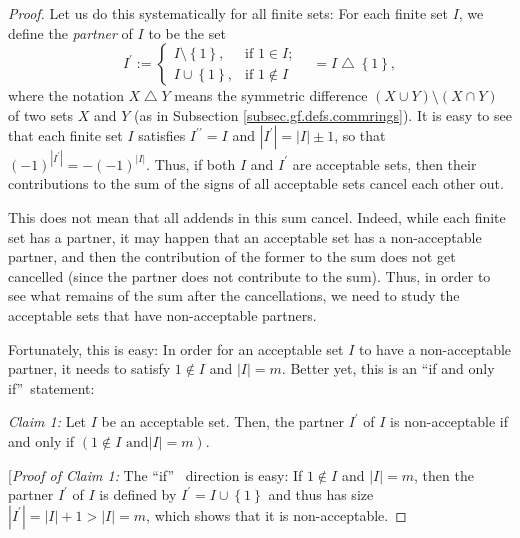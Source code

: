 \begin{proof}
Let us do this systematically for all finite sets: For each finite set $I$, we
define the \emph{partner} of $I$ to be the set%
\[
I^{\prime}:=%
\begin{cases}
I\setminus\left\{  1\right\}  , & \text{if }1\in I;\\
I\cup\left\{  1\right\}  , & \text{if }1\notin I
\end{cases}
\ \ \ \ =I\bigtriangleup\left\{  1\right\}  ,
\]
where the notation $X\bigtriangleup Y$ means the symmetric difference $\left(
X\cup Y\right)  \setminus\left(  X\cap Y\right)  $ of two sets $X$ and $Y$ (as
in Subsection \ref{subsec.gf.defs.commrings}). It is easy to see that each
finite set $I$ satisfies $I^{\prime\prime}=I$ and $\left\vert I^{\prime
}\right\vert =\left\vert I\right\vert \pm1$, so that $\left(  -1\right)
^{\left\vert I^{\prime}\right\vert }=-\left(  -1\right)  ^{\left\vert
I\right\vert }$. Thus, if both $I$ and $I^{\prime}$ are acceptable sets, then
their contributions to the sum of the signs of all acceptable sets cancel each
other out.

This does not mean that all addends in this sum cancel. Indeed, while each
finite set has a partner, it may happen that an acceptable set has a
non-acceptable partner, and then the contribution of the former to the sum
does not get cancelled (since the partner does not contribute to the sum).
Thus, in order to see what remains of the sum after the cancellations, we need
to study the acceptable sets that have non-acceptable partners.

Fortunately, this is easy: In order for an acceptable set $I$ to have a
non-acceptable partner, it needs to satisfy $1\notin I$ and $\left\vert
I\right\vert =m$. Better yet, this is an \textquotedblleft if and only
if\textquotedblright\ statement:

\begin{statement}
\textit{Claim 1:} Let $I$ be an acceptable set. Then, the partner $I^{\prime}$
of $I$ is non-acceptable if and only if $\left(  1\notin I\text{ and
}\left\vert I\right\vert =m\right)  $.
\end{statement}

[\textit{Proof of Claim 1:} The \textquotedblleft if\textquotedblright%
\ direction is easy: If $1\notin I$ and $\left\vert I\right\vert =m$, then the
partner $I^{\prime}$ of $I$ is defined by $I^{\prime}=I\cup\left\{  1\right\}
$ and thus has size $\left\vert I^{\prime}\right\vert =\left\vert I\right\vert
+1>\left\vert I\right\vert =m$, which shows that it is non-acceptable.


\end{proof}
